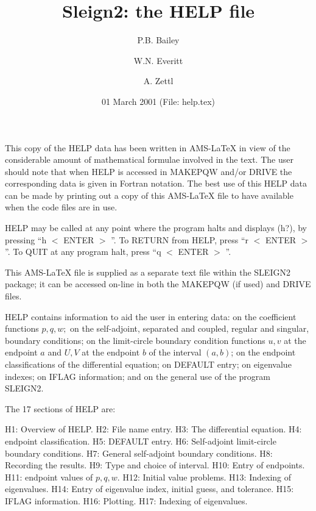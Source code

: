 \documentclass[12pt]{amsart}%
\theoremstyle{plain}
\numberwithin{equation}{section}
\numberwithin{theorem}{section}
\begin{document}
\title[HELP file]{Sleign2: the HELP file}
\author{P.B. Bailey}
\author{W.N. Everitt}
\author{A. Zettl}
\address{Department of Mathematical Sciences, Northern Illinois University, DeKalb, IL
60115-2888, USA}
\date{01 March 2001 (File: help.tex)}
\maketitle


This copy of the HELP data has been written in AMS-LaTeX in view of the
considerable amount of mathematical formulae involved in the text. The user
should note that when HELP is accessed in MAKEPQW and/or DRIVE the
corresponding data is given in Fortran notation. The best use of this HELP
data can be made by printing out a copy of this AMS-LaTeX file to have
available when the code files are in use.

HELP may be called at any point where the program halts and displays (h?), by
pressing ``h
$<$%
ENTER%
$>$%
''. To RETURN from HELP, press ``r
$<$%
ENTER%
$>$%
''. To QUIT at any program halt, press ``q
$<$%
ENTER%
$>$%
''.

This AMS-LaTeX file is supplied as a separate text file within the SLEIGN2
package; it can be accessed on-line in both the MAKEPQW (if used) and DRIVE files.

HELP contains information to aid the user in entering data: on the coefficient
functions $p,q,w;$ on the self-adjoint, separated and coupled, regular and
singular, boundary conditions; on the limit-circle boundary condition
functions $u,v$ at the endpoint $a$ and $U,V$ at the endpoint $b$ of the
interval $(a,b)$; on the endpoint classifications of the differential
equation; on DEFAULT entry; on eigenvalue indexes; on IFLAG information; and
on the general use of the program SLEIGN2.

\medskip

The 17 sections of HELP are:

H1: Overview of HELP. H2: File name entry. H3: The differential equation. H4:
endpoint classification. H5: DEFAULT entry. H6: Self-adjoint limit-circle
boundary conditions. H7: General self-adjoint boundary conditions. H8:
Recording the results. H9: Type and choice of interval. H10: Entry of
endpoints. H11: endpoint values of $p,q,w$. H12: Initial value problems. H13:
Indexing of eigenvalues. H14: Entry of eigenvalue index, initial guess, and
tolerance. H15: IFLAG information. H16: Plotting. H17: Indexing of eigenvalues.
\end{document}
